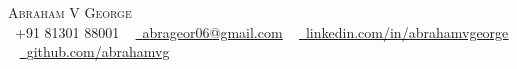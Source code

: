 \begin{center}
    {\Huge \scshape Abraham V George} \\ \vspace{1pt}
    \vspace{10pt}
    \small \raisebox{-0.1\height}\faPhone\ +91 81301 88001 ~ \href{abrageor06@gmail.com}{\raisebox{-0.2\height}\faEnvelope\  \underline{abrageor06@gmail.com}} ~ \href{https://linkedin.com/in/abrahamvgeorge/}{\raisebox{-0.2\height}\faLinkedin\ \underline{linkedin.com/in/abrahamvgeorge}}  ~
    \href{https://github.com/abrahamvg}{\raisebox{-0.2\height}\faGithub\ \underline{github.com/abrahamvg}}
    \vspace{-4pt}
\end{center}